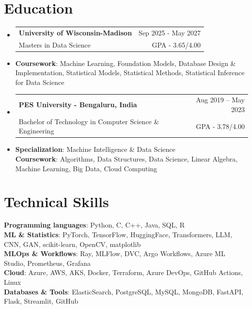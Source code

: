 \documentclass[letterpaper,11pt]{article}
\makeatletter
\newcommand{\resumeItem}[1]{
  \item\small{
    {#1 \vspace{-2pt}}
  }
}
\newcommand{\resumeSubheading}[4]{
  \vspace{-2pt}\item
    \begin{tabular*}{0.97\textwidth}[t]{l@{\extracolsep{\fill}}r}
      \textbf{#1} & #2 \\
      \small#3 & \small #4 \\
    \end{tabular*}\vspace{-7pt}
}
\newcommand{\resumeSubHeadingListStart}{\begin{itemize}[leftmargin=0.15in, label={}]}
\newcommand{\resumeSubHeadingListEnd}{\end{itemize}}
\makeatother
\begin{document}
\section{Education}

  \resumeSubHeadingListStart
    \resumeSubheading
      {University of Wisconsin-Madison}{Sep 2025 - May 2027}
      {Masters in Data Science}{GPA - 3.65/4.00}       
      \resumeItem{\textbf{Coursework}: Machine Learning, Foundation Models, Database Design \& Implementation, Statistical Models, Statistical Methods, Statistical Inference for Data Science}
    
    \resumeSubheading
      {PES University - Bengaluru, India }{Aug 2019 -- May 2023}
      {Bachelor of Technology in Computer Science \& Engineering}{GPA - 3.78/4.00}
      \resumeItem{\textbf{Specialization}: Machine Intelligence \& Data Science \\ \textbf{Coursework}: Algorithms, Data Structures, Data Science, Linear Algebra, Machine Learning, Big Data, Cloud Computing}
    
  \resumeSubHeadingListEnd

\section{Technical Skills}
 \begin{itemize}[leftmargin=0.15in, label={}]
    \small{\item{
     \textbf{Programming languages}{: Python, C, C++, Java, SQL, R} \\ \vspace{0.2pt}
     \textbf{ML \& Statistics}{: PyTorch, TensorFlow, HuggingFace, Transformers, LLM, CNN, GAN, scikit-learn, OpenCV, matplotlib} \\ \vspace{0.2pt}
     \textbf{MLOps \& Workflows}{: Ray, MLFlow, DVC, Argo Workflows, Azure ML Studio, Prometheus, Grafana} \\ \vspace{0.2pt}
     \textbf{Cloud}{: Azure, AWS, AKS, Docker, Terraform, Azure DevOps, GitHub Actions, Linux} \\ \vspace{0.2pt}
     \textbf{Databases \& Tools}{: ElasticSearch, PostgreSQL, MySQL, MongoDB, FastAPI, Flask, Streamlit, GitHub}
     }}
 \end{itemize}


\end{document}
